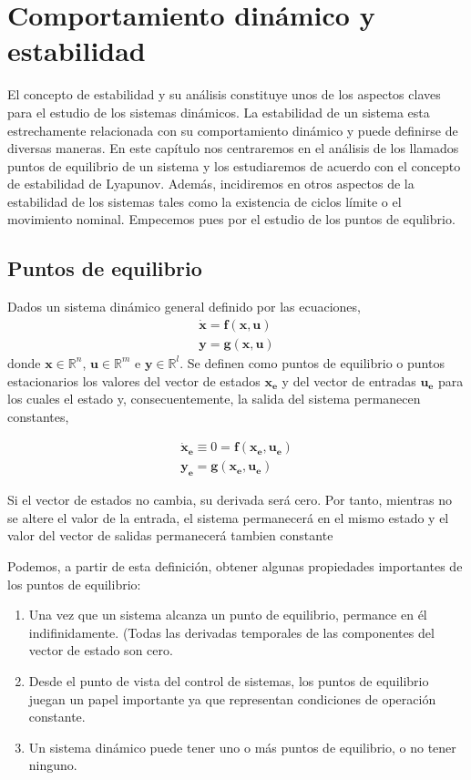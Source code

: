 \chapter{Comportamiento dinámico y estabilidad}

El concepto de estabilidad y su análisis constituye unos de los aspectos claves para el estudio de los sistemas dinámicos. La estabilidad de un sistema esta estrechamente relacionada con su comportamiento dinámico y puede definirse de diversas maneras. En este capítulo nos centraremos en el análisis de los llamados puntos de equilibrio de un sistema y los estudiaremos de acuerdo con el concepto de estabilidad de Lyapunov. Además, incidiremos en otros aspectos de la estabilidad de los sistemas tales como la existencia de ciclos límite o el movimiento nominal. Empecemos pues por el estudio de los puntos de equlibrio.
\section{Puntos de equilibrio} 
\begin{definition} Dados un sistema dinámico general definido por las ecuaciones,
\begin{align}
\mathbf{\dot{x}} = \mathbf{f}(\mathbf{x},\mathbf{u})\\
\mathbf{y} = \mathbf{g}(\mathbf{x},\mathbf{u})
\end{align}
donde $\mathbf{x} \in \mathbb{R}^n$, $\mathbf{u} \in \mathbb{R}^m$ e $\mathbf{y} \in \mathbb{R}^l$. Se definen como puntos de equilibrio o puntos estacionarios los valores del vector de estados $\mathbf{x_e}$ y del vector de entradas $\mathbf{u_e}$ para los cuales el estado y, consecuentemente, la salida del sistema permanecen constantes,

\begin{align}
\mathbf{\dot{x}_e} \equiv 0 = \mathbf{f}(\mathbf{x_e},\mathbf{u_e})\\
\mathbf{y_e} = \mathbf{g}(\mathbf{x_e},\mathbf{u_e})
\end{align}
\end{definition}

Si el vector de estados no cambia, su derivada será cero. Por tanto, mientras no se altere el valor de la entrada, el sistema permanecerá en el mismo estado y el valor del vector de salidas permanecerá tambien constante

Podemos, a partir de esta definición, obtener algunas propiedades importantes de los puntos de equilibrio:
\begin{enumerate}
\item Una vez que un sistema alcanza un punto de equilibrio, permance en él indifinidamente. (Todas las derivadas temporales de las componentes del vector de estado son cero.
\item Desde el punto de vista del control de sistemas, los puntos de equilibrio juegan un papel importante ya que representan condiciones de operación constante.
\item Un sistema dinámico puede tener uno o más puntos de equilibrio, o no tener ninguno. 
\end{enumerate}

